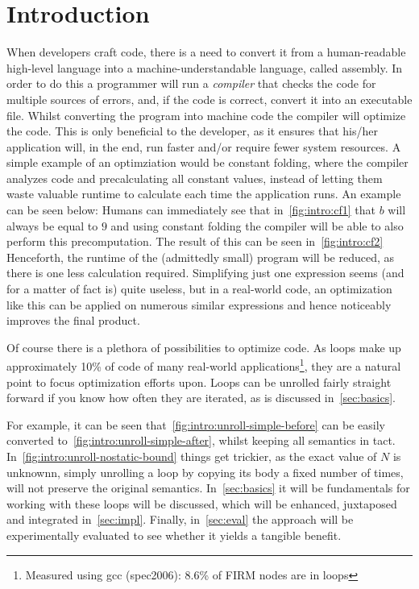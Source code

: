 \chapter{Introduction}\label{sec:intro}



When developers craft code, there is a need to convert it from a human-readable high-level language into a machine-understandable language, called assembly.
In order to do this a programmer will run a \textit{compiler} that checks the code for multiple sources of errors, and, if the code is correct, convert it into an executable file.
Whilst converting the program into machine code the compiler will optimize the code.
This is only beneficial to the developer, as it ensures that his/her application will, in the end, run faster and/or require fewer system resources.
A simple example of an optimziation would be constant folding, where the compiler analyzes code and precalculating all constant values, instead of letting them waste valuable runtime to calculate each time the application runs.
An example can be seen below:
Humans can immediately see that in~\cref{fig:intro:cf1} that $b$ will always be equal to $9$ and using constant folding the compiler will be able to also perform this precomputation.
The result of this can be seen in~\cref{fig:intro:cf2}
Henceforth, the runtime of the (admittedly small) program will be reduced, as there is one less calculation required.
Simplifying just one expression seems (and for a matter of fact is) quite useless, but in a real-world code, an optimization like this can be applied on numerous similar expressions and hence noticeably improves the final product.



Of course there is a plethora of possibilities to optimize code.
As loops make up approximately 10\% of code of many real-world applications\footnote{Measured using gcc (spec2006): 8.6\% of FIRM nodes are in loops}, they are a natural point to focus optimization efforts upon.
Loops can be unrolled fairly straight forward if you know how often they are iterated, as is discussed in~\cref{sec:basics}.

For example, it can be seen that~\cref{fig:intro:unroll-simple-before} can be easily converted to~\cref{fig:intro:unroll-simple-after}, whilst keeping all semantics in tact.
In~\cref{fig:intro:unroll-nostatic-bound} things get trickier, as the exact value of $N$ is unknownn, simply unrolling a loop by copying its body a fixed number of times, will not preserve the original semantics.
In~\cref{sec:basics} it will be fundamentals for working with these loops will be discussed, which will be enhanced, juxtaposed and integrated in~\cref{sec:impl}.
Finally, in~\cref{sec:eval} the approach will be experimentally evaluated to see whether it yields a tangible benefit.




